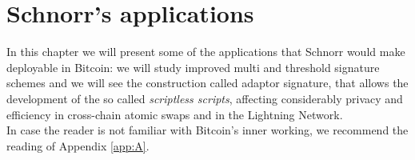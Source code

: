 \chapter{Schnorr's applications}
\label{chpr:application}
In this chapter we will present some of the applications that Schnorr would make deployable in Bitcoin: we will study improved multi and threshold signature schemes and we will see the construction called adaptor signature, that allows the development of the so called \textit{scriptless scripts}, affecting considerably privacy and efficiency in cross-chain atomic swaps and in the Lightning Network.
\\
In case the reader is not familiar with Bitcoin's inner working, we recommend the reading of Appendix \ref{app:A}.

\bigskip


